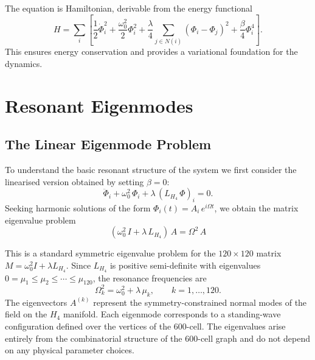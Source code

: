\documentclass[12pt,a4paper]{article}
\newcommand{\Hfour}{H_4}
\newcommand{\Lmat}{L_{H_4}}
\begin{document}
The equation is Hamiltonian, derivable from the energy functional
\begin{equation}\label{eq:hamiltonian}
  H = \sum_{i} \left[
    \frac{1}{2}\dot{\Phi}_i^2
    + \frac{\omega_0^2}{2}\Phi_i^2
    + \frac{\lambda}{4}\sum_{j \in N(i)}(\Phi_i - \Phi_j)^2
    + \frac{\beta}{4}\Phi_i^4
  \right].
\end{equation}
This ensures energy conservation and provides a variational foundation for the
dynamics.


\section{Resonant Eigenmodes}\label{sec:eigenmodes}

\subsection{The Linear Eigenmode Problem}

To understand the basic resonant structure of the system we first consider the
linearised version obtained by setting $\beta = 0$:
\begin{equation}\label{eq:linear}
  \ddot{\Phi}_i
  + \omega_0^2\,\Phi_i
  + \lambda\,(\Lmat\,\Phi)_i = 0.
\end{equation}
Seeking harmonic solutions of the form
$\Phi_i(t) = A_i\,e^{i\Omega t}$,
we obtain the matrix eigenvalue problem
\begin{equation}\label{eq:eigenvalue}
  \boxed{(\omega_0^2\,I + \lambda\,\Lmat)\,A = \Omega^2\,A}
\end{equation}

This is a standard symmetric eigenvalue problem for the $120 \times 120$
matrix $M = \omega_0^2 I + \lambda\Lmat$.  Since $\Lmat$ is positive
semi-definite with eigenvalues
$0 = \mu_1 \le \mu_2 \le \cdots \le \mu_{120}$,
the resonance frequencies are
\begin{equation}\label{eq:frequencies}
  \Omega_k^2 = \omega_0^2 + \lambda\,\mu_k, \qquad k = 1,\ldots,120.
\end{equation}
The eigenvectors $A^{(k)}$ represent the symmetry-constrained normal modes of
the field on the $\Hfour$ manifold.  Each eigenmode corresponds to a
standing-wave configuration defined over the vertices of the 600-cell.
The eigenvalues arise entirely from the combinatorial structure of the
600-cell graph and do not depend on any physical parameter choices.
\end{document}
